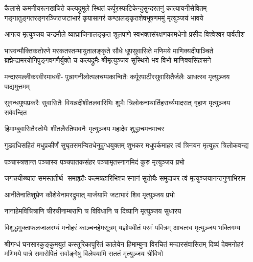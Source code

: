 

\fourlineindentedshloka
{कैलासे कमनीयरत्नखचिते कल्पद्रुमूले स्थितं}
{कर्पूरस्फटिकेन्दुसुन्दरतनुं कात्यायनीसेवितम्}
{गङ्गातुङ्गतरङ्गरञ्जितजटाभारं कृपासागरं}
{कण्ठालङ्कृतशेषभूषणममुं मृत्युञ्जयं भावये}%

\fourlineindentedshloka
{आगत्य मृत्युञ्जय चन्द्रमौले}
{व्याघ्राजिनालङ्कृत शूलपाणे}
{स्वभक्तसंरक्षणकामधेनो}
{प्रसीद विश्वेश्वर पार्वतीश}%

\fourlineindentedshloka
{भास्वन्मौक्तिकतोरणे मरकतस्तम्भायुतालङ्कृते}
{सौधे धूपसुवासिते मणिमये माणिक्यदीपाञ्चिते}
{ब्रह्मेन्द्रामरयोगिपुङ्गवगणैर्युक्ते च कल्पद्रुमैः}
{श्रीमृत्युञ्जय सुस्थिरो भव विभो माणिक्यसिंहासने}%

\fourlineindentedshloka
{मन्दारमल्लीकरवीरमाधवी-}
{पुन्नागनीलोत्पलचम्पकान्वितैः}
{कर्पूरपाटीरसुवासितैर्जलैः}
{आधत्स्व मृत्युञ्जय पाद्यमुत्तमम्}%

\fourlineindentedshloka
{सुगन्धपुष्पप्रकरैः सुवासितैः}
{वियन्नदीशीतलवारिभिः शुभैः}
{त्रिलोकनाथार्तिहरार्घ्यमादरात्}
{गृहाण मृत्युञ्जय सर्ववन्दित}%

\twolineshloka
{हिमाम्बुवासितैस्तोयैः शीतलैरतिपावनैः}
{मृत्युञ्जय महादेव शुद्धाचमनमाचर}%

\fourlineindentedshloka
{गुडदधिसहितं मधुप्रकीर्णं}
{सुघृतसमन्वितधेनुदुग्धयुक्तम्}
{शुभकर मधुपर्कमाहर त्वं}
{त्रिनयन मृत्युहर त्रिलोकवन्द्य}%

\twolineshloka
{पञ्चास्त्रशान्त पञ्चास्य पञ्चपातकसंहर}
{पञ्चामृतस्नानमिदं कुरु मृत्युञ्जय प्रभो}%

\fourlineindentedshloka
{जगत्त्रयीख्यात समस्ततीर्थ-}
{समाहृतैः कल्मषहारिभिश्च}
{स्नानं सुतोयैः समुदाचर त्वं}
{मृत्युञ्जयानन्तगुणाभिराम}%

\twolineshloka
{आनीतेनातिशुभ्रेण कौशेयेनामरद्रुमात्}
{मार्जयामि जटाभारं शिव मृत्युञ्जय प्रभो}%

\twolineshloka
{नानाहेमविचित्राणि चीरचीनाम्बराणि च}
{विविधानि च दिव्यानि मृत्युञ्जय सुधारय}%

\fourlineindentedshloka
{विशुद्धमुक्ताफलजालरम्यं}
{मनोहरं काञ्चनहेमसूत्रम्}
{यज्ञोपवीतं परमं पवित्रम्}
{आधत्स्व मृत्युञ्जय भक्तिगम्य}%

\fourlineindentedshloka
{श्रीगन्धं घनसारकुङ्कुमयुतं कस्तूरिकापूरितं}
{कालेयेन हिमाम्बुना विरचितं मन्दारसंवासितम्}
{दिव्यं देवमनोहरं मणिमये पात्रे समारोपितं}
{सर्वाङ्गेषु विलेपयामि सततं मृत्युञ्जय श्रीविभो}%

